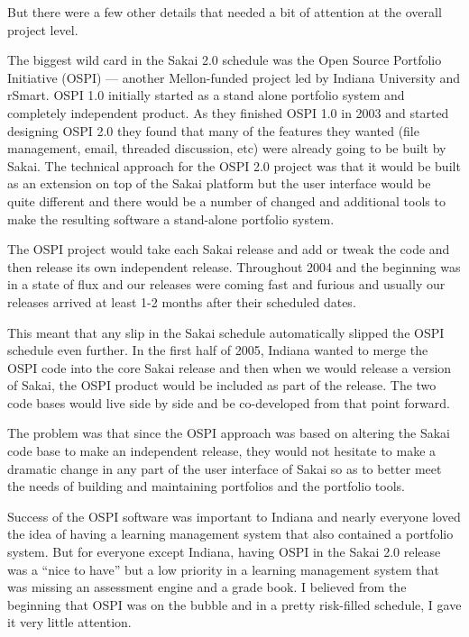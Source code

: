 \documentclass[12pt]{book}
\begin{document}
But there were a few other details that needed a bit
of attention at the overall project level.

The biggest wild card in the Sakai 2.0 schedule
was the Open Source Portfolio Initiative (OSPI) ---
another Mellon-funded project led by Indiana
University and rSmart.  OSPI 1.0 initially started as a
stand alone portfolio system and
completely independent product.   As they finished
OSPI 1.0 in 2003 and started designing OSPI 2.0 they found
that many of the features they wanted
(file management, email, threaded discussion, etc)
were already going to be built by Sakai.
The technical approach for the OSPI 2.0 project
was that it would be built as an extension
on top of the Sakai platform
but the user interface would be quite different
and there would be a number of changed and additional
tools to make the resulting software a stand-alone
portfolio system.

The OSPI project would take each Sakai
release and add or tweak the code and
then release its own independent release.
Throughout 2004 and the beginning
was in a state of flux and our releases were
coming fast and furious and usually
our releases arrived at least 1-2 months
after their scheduled dates.

This meant that any slip in the Sakai schedule
automatically slipped the OSPI schedule even further.
In the first half of 2005, Indiana wanted to
merge the OSPI code into the core Sakai release
and then when we would release a version of
Sakai, the OSPI product would be included as part of the release.
The two code bases would live side by side and be
co-developed from that point forward.

The problem was that since the OSPI approach was
based on altering the Sakai code base to make
an independent release, they would
not hesitate to make a dramatic change in
any part of the user interface of Sakai so
as to better meet the needs of building and
maintaining portfolios and the portfolio
tools.

Success of the OSPI software was important
to Indiana and nearly everyone loved the idea
of having a learning management system that also
contained a portfolio system.  But for everyone
except Indiana, having OSPI in the Sakai 2.0
release was a ``nice to have'' but a low
priority in a learning management system
that was missing an assessment engine and
a grade book.  I believed from the beginning
that OSPI was on the bubble and in a pretty
risk-filled schedule, I gave it very little
attention.
\end{document}
